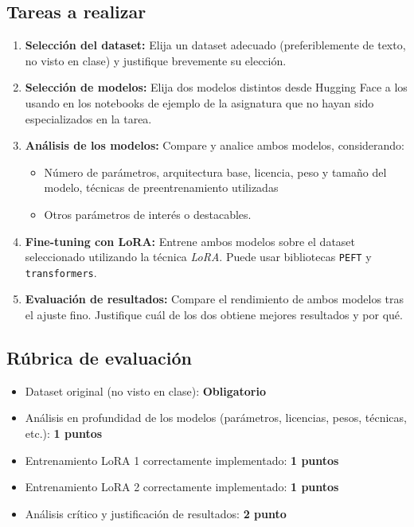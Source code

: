 \documentclass[a4paper]{article}
\begin{document}
\subsection*{Tareas a realizar}
\begin{enumerate}
    \item \textbf{Selección del dataset:}  
    Elija un dataset adecuado (preferiblemente de texto, no visto en clase) y justifique brevemente su elección.
    
    \item \textbf{Selección de modelos:}  
    Elija dos modelos distintos desde Hugging Face a los usando en los notebooks de ejemplo de la asignatura que no hayan sido especializados en la tarea.
    
    \item \textbf{Análisis de los modelos:}  
    Compare y analice ambos modelos, considerando:
    \begin{itemize}
        \item Número de parámetros, arquitectura base, licencia, peso y tamaño del modelo, técnicas de preentrenamiento utilizadas
        \item Otros parámetros de interés o destacables.
    \end{itemize}
    
    \item \textbf{Fine-tuning con LoRA:}  
    Entrene ambos modelos sobre el dataset seleccionado utilizando la técnica \textit{LoRA}.  
    Puede usar bibliotecas \texttt{PEFT} y \texttt{transformers}.
    
    \item \textbf{Evaluación de resultados:}  
    Compare el rendimiento de ambos modelos tras el ajuste fino.  
    Justifique cuál de los dos obtiene mejores resultados y por qué.
\end{enumerate}

\subsection*{Rúbrica de evaluación}
\begin{itemize}
    \item Dataset original (no visto en clase): \textbf{Obligatorio}
    \item Análisis en profundidad de los modelos (parámetros, licencias, pesos, técnicas, etc.): \textbf{1 puntos}
    \item Entrenamiento LoRA 1 correctamente implementado: \textbf{1 puntos}
    \item Entrenamiento LoRA 2 correctamente implementado: \textbf{1 puntos}
    \item Análisis crítico y justificación de resultados: \textbf{2 punto}
\end{itemize}
\end{document}
